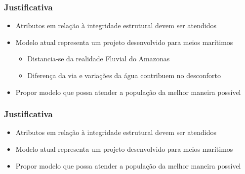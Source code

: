 \documentclass{beamer}
\begin{document}
\begin{frame}
\frametitle{Justificativa}
\begin{itemize}
	\item Atributos em relação à integridade estrutural devem ser atendidos
	\item \alert{Modelo atual representa um projeto desenvolvido para meios marítimos}
	\begin{itemize}
		\item Distancia-se da realidade Fluvial do Amazonas
		\item Diferença da via e variações da água contribuem no desconforto
	\end{itemize}
	\item Propor modelo que possa atender a população da melhor maneira possível  
\end{itemize}
\end{frame}
\begin{frame}
\frametitle{Justificativa}
\begin{itemize}
	\item Atributos em relação à integridade estrutural devem ser atendidos
	\item Modelo atual representa um projeto desenvolvido para meios marítimos
	\item \alert{Propor modelo que possa atender a população da melhor maneira possível}  
\end{itemize}
\end{frame}

\end{document}
